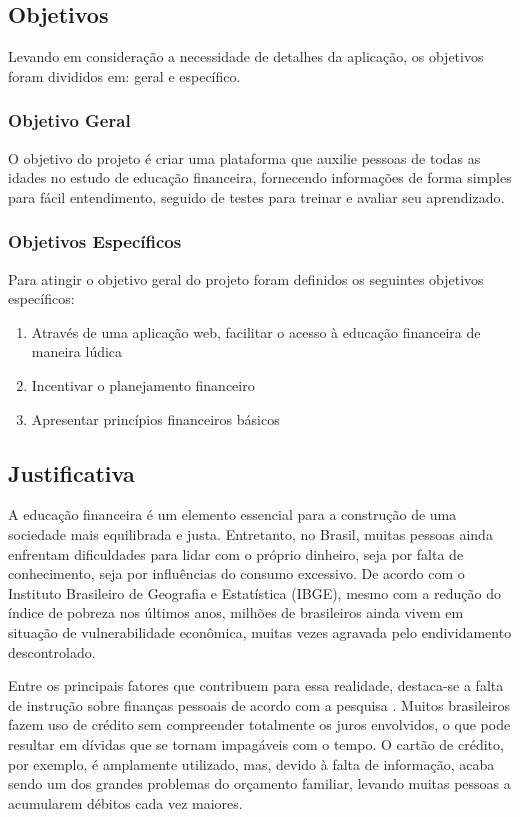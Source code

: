 \documentclass[
	article,			%
	12pt,				%
	oneside,			%
	a4paper,			%
	english,			%
	brazil,				%
	sumario=tradicional
	]{abntex2}
\begin{document}
\subsection{Objetivos}
    Levando em consideração a necessidade de detalhes da aplicação, os objetivos foram divididos em: geral e específico.
\subsubsection{Objetivo Geral}
    O objetivo do projeto é criar uma plataforma que auxilie pessoas de todas as idades no estudo de educação financeira, fornecendo informações de forma simples para fácil entendimento, seguido de testes para treinar e avaliar seu aprendizado.
\subsubsection{Objetivos Específicos}
    Para atingir o objetivo geral do projeto foram definidos os seguintes objetivos específicos:
        \begin{enumerate}[label=\alph*)]
            \item Através de uma aplicação web, facilitar o acesso à educação financeira de maneira lúdica
            \item Incentivar o planejamento financeiro
            \item Apresentar princípios financeiros básicos 
        \end{enumerate}
       
\subsection{Justificativa}    
    A educação financeira é um elemento essencial para a construção de uma sociedade mais equilibrada e justa. Entretanto, no Brasil, muitas pessoas ainda enfrentam dificuldades para lidar com o próprio dinheiro, seja por falta de conhecimento, seja por influências do consumo excessivo. De acordo com o Instituto Brasileiro de Geografia e Estatística (IBGE), mesmo com a redução do índice de pobreza nos últimos anos, milhões de brasileiros ainda vivem em situação de vulnerabilidade econômica, muitas vezes agravada pelo endividamento descontrolado.

    Entre os principais fatores que contribuem para essa realidade, destaca-se a falta de instrução sobre finanças pessoais de acordo com a pesquisa . Muitos brasileiros fazem uso de crédito sem compreender totalmente os juros envolvidos, o que pode resultar em dívidas que se tornam impagáveis com o tempo. O cartão de crédito, por exemplo, é amplamente utilizado, mas, devido à falta de informação, acaba sendo um dos grandes problemas do orçamento familiar, levando muitas pessoas a acumularem débitos cada vez maiores.
\end{document}
